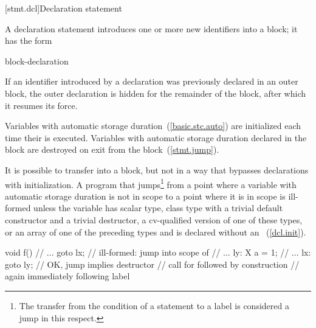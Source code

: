 [stmt.dcl]{Declaration statement}%

\pnum
A declaration statement introduces one or more new identifiers into a
block; it has the form

\begin{bnf}
\br
    block-declaration
\end{bnf}

If an identifier introduced by a declaration was previously declared in
an outer block,
%
%
%
the outer declaration is hidden for the remainder of the block, after
which it resumes its force.

\pnum
{}%
%
Variables with automatic storage duration~(\ref{basic.stc.auto}) are
initialized each time their  is executed.
%
Variables with automatic storage duration declared in the block are
destroyed on exit from the block~(\ref{stmt.jump}).

\pnum
{}%
%
It is possible to transfer into a block, but not in a way that bypasses
declarations with initialization. A program that jumps\footnote{The transfer from the condition of a  statement to a
 label is considered a jump in this respect.}
from a point where a variable with automatic storage duration is
not in scope to a point where it is in scope is ill-formed unless the
variable has scalar type, class type with a trivial default constructor and a trivial destructor, a cv-qualified version of one of these types, or an array of one of the preceding types and is declared without an
~(\ref{dcl.init}).
\enterexample

\begin{codeblock}
void f() {
  // ... 
  goto lx;          // ill-formed: jump into scope of 
  // ...
ly:
  X a = 1;
  // ...
lx:
  goto ly;          // OK, jump implies destructor
                    // call for  followed by construction
                    // again immediately following label 
}
\end{codeblock}
\exitexample

